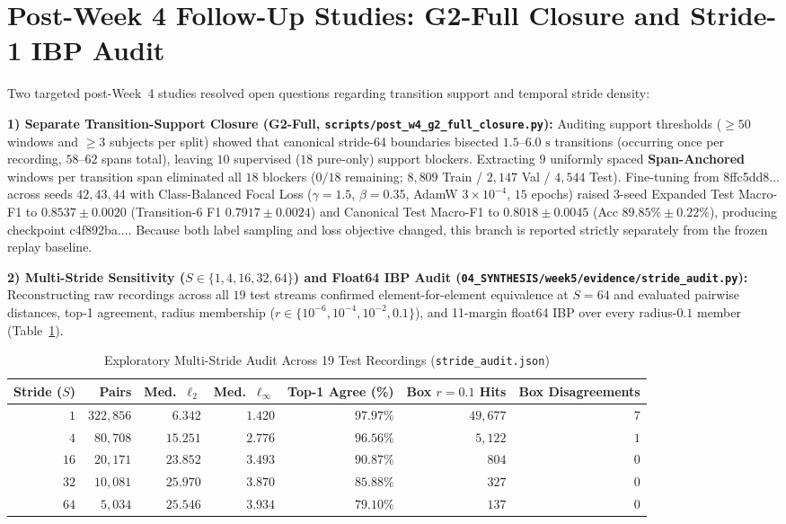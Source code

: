 \documentclass[11pt,oneside,a4paper]{report}
\newcommand{\code}[1]{{\small\upshape\ttfamily #1}}
\theoremstyle{remark}
\begin{document}
\section{Post-Week 4 Follow-Up Studies: G2-Full Closure and Stride-1 IBP Audit}
Two targeted post-Week~4 studies resolved open questions regarding transition support and temporal stride density:

\textbf{1) Separate Transition-Support Closure (\code{G2-Full}, \nolinkurl{scripts/post_w4_g2_full_closure.py}):} Auditing support thresholds ($\ge 50$ windows and $\ge 3$ subjects per split) showed that canonical stride-64 boundaries bisected $1.5\text{--}6.0\text{ s}$ transitions (occurring once per recording, $58\text{--}62$ spans total), leaving $10$ supervised ($18$ pure-only) support blockers. Extracting $9$ uniformly spaced \textbf{Span-Anchored} windows per transition span eliminated all $18$ blockers ($0/18$ remaining; $8,809$ Train / $2,147$ Val / $4,544$ Test). Fine-tuning from \code{8ffc5dd8...} across seeds $42, 43, 44$ with Class-Balanced Focal Loss ($\gamma=1.5$, $\beta=0.35$, AdamW $3\times 10^{-4}$, $15$ epochs) raised 3-seed Expanded Test Macro-F1 to $0.8537 \pm 0.0020$ (Transition-6 F1 $0.7917 \pm 0.0024$) and Canonical Test Macro-F1 to $0.8018 \pm 0.0045$ (Acc $89.85\% \pm 0.22\%$), producing checkpoint \code{c4f892ba...}. Because both label sampling and loss objective changed, this branch is reported strictly separately from the frozen replay baseline.

\textbf{2) Multi-Stride Sensitivity ($S \in \{1,4,16,32,64\}$) and Float64 IBP Audit (\nolinkurl{04_SYNTHESIS/week5/evidence/stride_audit.py}):} Reconstructing raw recordings across all $19$ test streams confirmed element-for-element equivalence at $S=64$ and evaluated pairwise distances, top-1 agreement, radius membership ($r \in \{10^{-6}, 10^{-4}, 10^{-2}, 0.1\}$), and 11-margin \code{float64} IBP over every radius-$0.1$ member (Table~\ref{tab:stride_synth}).

\begin{table}[htbp]
\centering\small
\caption{Exploratory Multi-Stride Audit Across 19 Test Recordings (\nolinkurl{stride_audit.json})}
\label{tab:stride_synth}
\begin{tabularx}{\textwidth}{@{}rrrrrrr@{}}
\toprule
\textbf{Stride ($S$)} & \textbf{Pairs} & \textbf{Med.\ $\ell_2$} & \textbf{Med.\ $\ell_\infty$} & \textbf{Top-1 Agree (\%)} & \textbf{Box $r{=}0.1$ Hits} & \textbf{Box Disagreements} \\
\midrule
$1$ & $322,856$ & $6.342$ & $1.420$ & $97.97\%$ & $49,677$ & $7$ \\
$4$ & $80,708$ & $15.251$ & $2.776$ & $96.56\%$ & $5,122$ & $1$ \\
$16$ & $20,171$ & $23.852$ & $3.493$ & $90.87\%$ & $804$ & $0$ \\
$32$ & $10,081$ & $25.970$ & $3.870$ & $85.88\%$ & $327$ & $0$ \\
$64$ & $5,034$ & $25.546$ & $3.934$ & $79.10\%$ & $137$ & $0$ \\
\bottomrule
\end{tabularx}
\end{table}
\end{document}
